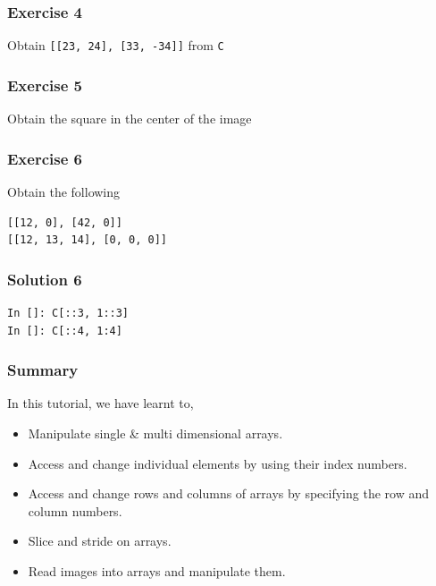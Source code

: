 \documentclass[presentation]{beamer}
\begin{document}
\begin{frame}
\frametitle{Exercise 4}
\label{sec-9}

  Obtain \verb~[[23, 24], [33, -34]]~ from \verb~C~
\end{frame}
\begin{frame}
\frametitle{Exercise 5}
\label{sec-10}

  Obtain the square in the center of the image
\end{frame}
\begin{frame}[fragile]
\frametitle{Exercise 6}
\label{sec-11}

  Obtain the following
\lstset{language=Python}
\begin{lstlisting}
[[12, 0], [42, 0]]
[[12, 13, 14], [0, 0, 0]]
\end{lstlisting}
\end{frame}
\begin{frame}[fragile]
\frametitle{Solution 6}
\label{sec-12}

\lstset{language=Python}
\begin{lstlisting}
In []: C[::3, 1::3]
In []: C[::4, 1:4]
\end{lstlisting}
\end{frame}
\begin{frame}
\frametitle{Summary}
\label{sec-13}

  In this tutorial, we have learnt to, 
 

\begin{itemize}
\item Manipulate single \& multi dimensional arrays.
\item Access and change individual elements by using their index numbers.
\item Access and change rows and columns of arrays by specifying the row 
    and column numbers.
\item Slice and stride on arrays.
\item Read images into arrays and manipulate them.
\end{itemize}
\end{frame}
\end{document}
